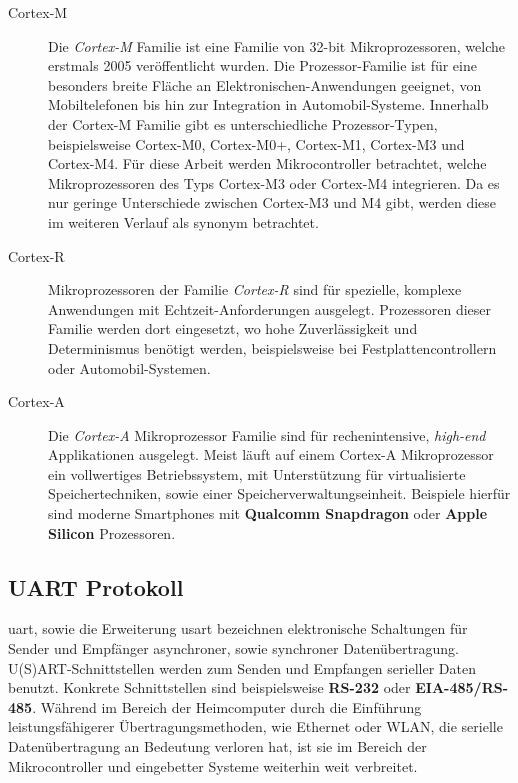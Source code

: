 \begin{description}
    \item[Cortex-M] 
    Die \textit{Cortex-M} Familie ist eine Familie von 32-bit Mikroprozessoren,
    welche erstmals 2005 veröffentlicht wurden\cite{DefGuideCM34_JYiu}.
    Die Prozessor-Familie ist für eine besonders breite Fläche an
    Elektronischen-Anwendungen geeignet, von Mobiltelefonen bis hin zur
    Integration in Automobil-Systeme.
    Innerhalb der Cortex-M Familie gibt es unterschiedliche Prozessor-Typen,
    beispielsweise Cortex-M0, Cortex-M0+, Cortex-M1, Cortex-M3 und
    Cortex-M4\cite{DefGuideCM34_JYiu}.
    Für diese Arbeit werden Mikrocontroller betrachtet, welche Mikroprozessoren
    des Typs Cortex-M3 oder Cortex-M4 integrieren.
    Da es nur geringe Unterschiede zwischen Cortex-M3 und M4 gibt, werden diese
    im weiteren Verlauf als synonym betrachtet.
    \item[Cortex-R] 
    Mikroprozessoren der Familie \textit{Cortex-R} sind für spezielle, komplexe
    Anwendungen mit Echtzeit-Anforderungen ausgelegt.
    Prozessoren dieser Familie werden dort eingesetzt, wo hohe Zuverlässigkeit
    und Determinismus benötigt werden, beispielsweise bei
    Festplattencontrollern oder Automobil-Systemen\cite{DefGuideCM34_JYiu}.
    \item[Cortex-A] 
    Die \textit{Cortex-A} Mikroprozessor Familie sind für rechenintensive,
    \textit{high-end} Applikationen ausgelegt.
    Meist läuft auf einem Cortex-A Mikroprozessor ein vollwertiges
    Betriebssystem, mit Unterstützung für virtualisierte Speichertechniken,
    sowie einer Speicherverwaltungseinheit\cite{DefGuideCM34_JYiu}.
    Beispiele hierfür sind moderne Smartphones mit \textbf{Qualcomm Snapdragon}
    oder \textbf{Apple Silicon} Prozessoren.
\end{description}

\subsection{UART Protokoll}

\ac{uart}, sowie die Erweiterung \ac{usart} bezeichnen elektronische
Schaltungen für Sender und Empfänger asynchroner, sowie synchroner
Datenübertragung\cite{Digitec_WGehrke_MWinzker}.
U(S)ART-Schnittstellen werden zum Senden und Empfangen serieller Daten benutzt.
Konkrete Schnittstellen sind beispielsweise \textbf{RS-232} oder
\textbf{EIA-485/RS-485}.
Während im Bereich der Heimcomputer durch die Einführung leistungsfähigerer
Übertragungsmethoden, wie Ethernet oder WLAN, die serielle Datenübertragung an
Bedeutung verloren hat, ist sie im Bereich der Mikrocontroller und eingebetter
Systeme weiterhin weit verbreitet\cite{Digitec_WGehrke_MWinzker}.

